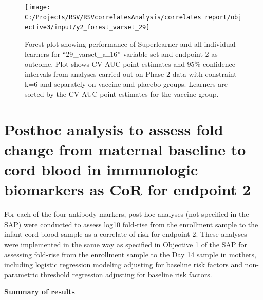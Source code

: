 \documentclass[11pt]{article}
\begin{document}
\begin{figure}[H]

{\centering \texttt{[image: C:/Projects/RSV/RSVcorrelatesAnalysis/correlates\_report/objective3/input/y2\_forest\_varset\_29]} 

}

\caption[Forest plot for ``29\_varset\_all16'' variable set, endpoint 2.]{\label{fig:obj3Appendix2}Forest plot showing performance of Superlearner and all individual learners for ``29\_varset\_all16'' variable set and endpoint 2 as outcome. Plot shows CV-AUC point estimates and 95\% confidence intervals from analyses carried out on Phase 2 data with constraint k=6 and separately on vaccine and placebo groups. Learners are sorted by the CV-AUC point estimates for the vaccine group.}\label{fig:y2-forest-varset-29}
\end{figure}

\clearpage

\hypertarget{posthoc-analysis-to-assess-fold-change-from-maternal-baseline-to-cord-blood-in-immunologic-biomarkers-as-cor-for-endpoint-2}{%
\section{Posthoc analysis to assess fold change from maternal baseline to cord blood in immunologic biomarkers as CoR for endpoint 2}\label{posthoc-analysis-to-assess-fold-change-from-maternal-baseline-to-cord-blood-in-immunologic-biomarkers-as-cor-for-endpoint-2}}

For each of the four antibody markers, post-hoc analyses (not specified in the SAP) were conducted to assess log10 fold-rise from the enrollment sample to the infant cord blood sample as a correlate of risk for endpoint 2. These analyses were implemented in the same way as specified in Objective 1 of the SAP for assessing fold-rise from the enrollment sample to the Day 14 sample in mothers, including logistic regression modeling adjusting for baseline risk factors and non-parametric threshold regression adjusting for baseline risk factors.

\textbf{Summary of results}
\end{document}
